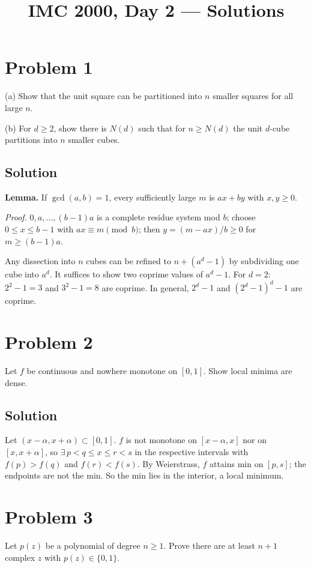 \documentclass{article}
\title{IMC 2000, Day 2 --- Solutions}
\begin{document}
\maketitle

\section*{Problem 1}
(a) Show that the unit square can be partitioned into $n$ smaller squares for all large $n$.

(b) For $d\ge 2$, show there is $N(d)$ such that for $n\ge N(d)$ the unit $d$-cube partitions into $n$ smaller cubes.

\subsection*{Solution}
\textbf{Lemma.} If $\gcd(a,b)=1$, every sufficiently large $m$ is $ax+by$ with $x,y\ge 0$.

\textit{Proof.} $0,a,\dots,(b-1)a$ is a complete residue system mod $b$; choose $0\le x\le b-1$ with $ax\equiv m\pmod b$; then $y=(m-ax)/b\ge 0$ for $m\ge (b-1)a$.

Any dissection into $n$ cubes can be refined to $n+(a^d-1)$ by subdividing one cube into $a^d$. It suffices to show two coprime values of $a^d-1$. For $d=2$: $2^2-1=3$ and $3^2-1=8$ are coprime. In general, $2^d-1$ and $(2^d-1)^d-1$ are coprime.

\section*{Problem 2}
Let $f$ be continuous and nowhere monotone on $[0,1]$. Show local minima are dense.

\subsection*{Solution}
Let $(x-\alpha, x+\alpha)\subset[0,1]$. $f$ is not monotone on $[x-\alpha,x]$ nor on $[x,x+\alpha]$, so $\exists\, p<q\le x\le r<s$ in the respective intervals with $f(p)>f(q)$ and $f(r)<f(s)$. By Weierstrass, $f$ attains min on $[p,s]$; the endpoints are not the min. So the min lies in the interior, a local minimum.

\section*{Problem 3}
Let $p(z)$ be a polynomial of degree $n\ge 1$. Prove there are at least $n+1$ complex $z$ with $p(z)\in\{0,1\}$.
\end{document}
